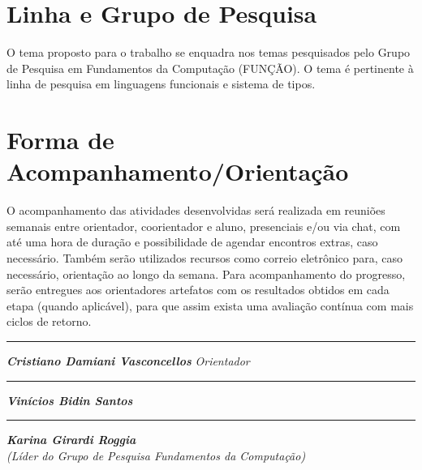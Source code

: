 \documentclass[12pt]{article}
\begin{document}
\section{Linha e Grupo de Pesquisa}
\label{sec:LinhaGrupoPesquisa}
O tema proposto para o trabalho se enquadra nos temas pesquisados pelo Grupo de Pesquisa em Fundamentos da Computação (FUNÇÃO).
O tema é pertinente à linha de pesquisa em linguagens funcionais e sistema de tipos.

\section{Forma de Acompanhamento/Orientação}
\label{sec:Acompanhamento}
O acompanhamento das atividades desenvolvidas será  realizada em reuniões semanais entre orientador, coorientador e aluno, presenciais e/ou via chat, com até uma hora de duração e possibilidade de agendar encontros extras, caso necessário.
Também serão utilizados recursos como correio eletrônico para, caso necessário, orientação ao longo da semana.
Para acompanhamento do progresso, serão entregues aos orientadores artefatos com os resultados obtidos em cada etapa (quando aplicável), para que assim exista uma avaliação contínua com mais ciclos de retorno.



\vskip 2cm

\begin{minipage}{0.47\linewidth}
	\centering
	\rule{7.2cm}{0.1mm}

	\textbf{\textit{Cristiano Damiani Vasconcellos}}
	\newline
	\textit{Orientador}
\end{minipage}
\begin{minipage}{0.47\linewidth}
	\centering
	\rule{7.2cm}{0.1mm}

	\textbf{\textit{Vinícios Bidin Santos}}
	\newline
\end{minipage}

\vskip 3cm

\begin{center}
	\rule{7.2cm}{0.1mm}

	\textbf{\textit{Karina Girardi Roggia}}\\
	\textit{(Líder do Grupo de Pesquisa Fundamentos da Computação)}
\end{center}
\end{document}
